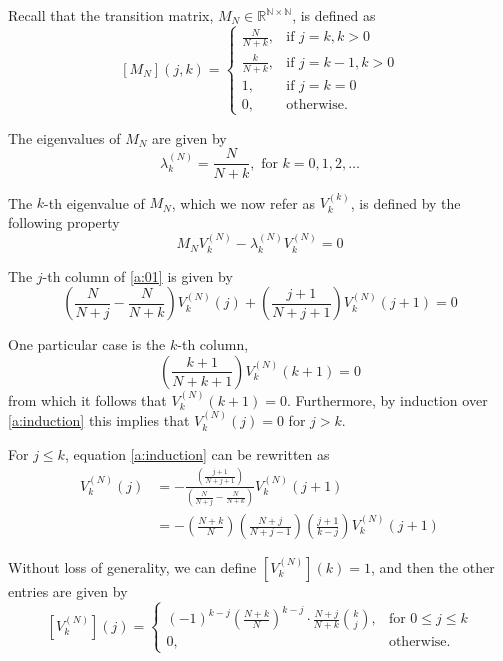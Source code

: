 \documentclass{article}
\newcommand{\N}{\mathbb{N}}
\newcommand{\R}{\mathbb{R}}
\newcommand{\ppar}[1]{\left( #1 \right)}
\newcommand{\spar}[1]{\left[ #1 \right]}
\begin{document}
Recall that the transition matrix, $M_N\in \R^{\N\times \N}$, is defined as
\begin{equation}
    \spar{M_N}(j,k) = 
    \begin{cases}
        \frac{N}{N+k}, &\text{if } j= k, k>0 \\
        \frac{k}{N+k}, &\text{if } j= k-1, k>0 \\
        1, &\text{if } j= k=0 \\
        0, &\text{otherwise.}
    \end{cases}
\end{equation}

The eigenvalues of $M_N$ are given by
\begin{equation}
    \lambda^{(N)}_k = \frac{N}{N+k}, \text{ for } k=0,1, 2, \dots
\end{equation}

The $k$-th eigenvalue of $M_N$, which we now refer as $V_k^{(k)}$, is defined by the following property
\begin{equation}
    M_N V_k^{(N)} - \lambda^{(N)}_k V_k^{(N)} = 0
    \label{a:01}
\end{equation}

The $j$-th column of \eqref{a:01} is given by
\begin{equation}
    \ppar{\frac{N}{N+j}-\frac{N}{N+k} } V_k^{(N)}(j) + \ppar{\frac{j+1}{N+j+1}}V_k^{(N)}(j+1) = 0
    \label{a:induction}
\end{equation}

One particular case is the $k$-th column,
\begin{equation}
    \ppar{\frac{k+1}{N+k+1}}V_k^{(N)}(k+1) = 0
\end{equation}
from which it follows that $V_k^{(N)}(k+1) = 0$. Furthermore, by induction over \eqref{a:induction} this implies that $V_k^{(N)}(j) = 0$ for $j>k$.

For $j\leq k$, equation \eqref{a:induction} can be rewritten as
\begin{align}
    V_k^{(N)}(j) 
    &= -
    \frac{\ppar{\frac{j+1}{N+j+1}}}{\ppar{\frac{N}{N+j}-\frac{N}{N+k} }}
    V_k^{(N)}(j+1)
    \nonumber \\
    &=
    -
    \ppar{\frac{N+k}{N}} \ppar{\frac{N+j}{N+j-1}} \ppar{\frac{j+1}{k-j}} V_k^{(N)}(j+1)
\end{align}

Without loss of generality, we can define $\spar{V_k^{(N)}}(k) = 1$, and then the other entries are given by
\begin{equation}
    \spar{V_k^{(N)}}(j) =
    \begin{cases}
    (-1)^{k-j} \ppar{\frac{N+k}{N}}^{k-j} \cdot \frac{N+j}{N+k} \binom{k}{j},
    &\text{for } 0 \leq j\leq k\\
    0, &\text{otherwise.}
    \end{cases}
\end{equation}
\end{document}
